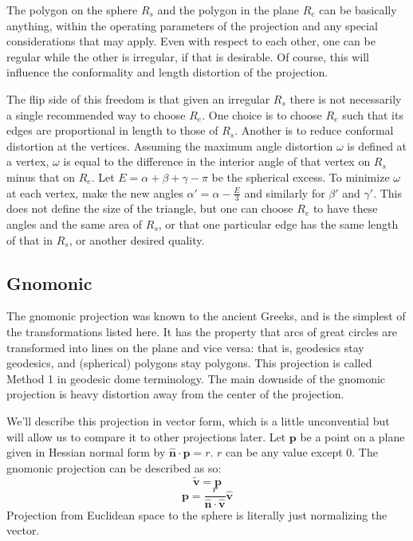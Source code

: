 \documentclass{amsart}[12pt]
\begin{document}
The polygon on the sphere $R_s$ and the polygon in the plane $R_e$ can be
basically anything, within the operating parameters of the projection and any
special considerations that may apply. Even with respect to each other, one
can be regular while the other is irregular, if that is desirable. Of course,
this will influence the conformality and length distortion of the projection.

The flip side of this freedom is that given an irregular $R_s$ there is not
necessarily a single recommended way to choose $R_e$. One choice is to choose
$R_e$ such that its edges are proportional in length to those of $R_s$. Another
is to reduce conformal distortion at the vertices. Assuming the maximum angle
distortion $\omega$ is defined at a vertex, $\omega$ is equal to the difference
in the interior angle of that vertex on $R_s$ minus that on $R_e$. Let
$E = \alpha + \beta + \gamma - \pi$ be the spherical excess. To minimize
$\omega$ at each vertex, make the new angles $\alpha' = \alpha - \frac{E}{3}$
and similarly for $\beta'$ and $\gamma'$. This does not define the size of the
triangle, but one can choose $R_e$ to have these angles and the same area of
$R_s$, or that one particular edge has the same length of that in $R_s$, or
another desired quality.

\subsection{Gnomonic}
The gnomonic projection was known to the ancient Greeks, and is the simplest
of the transformations listed here.\cite{snyder87} It has the property that
arcs of great circles are transformed into lines on the plane and vice versa:
that is, geodesics stay geodesics, and (spherical) polygons stay polygons. This
projection is called Method 1 in geodesic dome terminology.\cite{kenner} The
main downside of the gnomonic projection is heavy distortion away from the
center of the projection.

We'll describe this projection in vector form, which is a little unconvential
but will allow us to compare it to other projections later.
Let $\mathbf p$ be a point on a plane given in Hessian normal form by
$\hat{\mathbf n} \cdot \mathbf p = r$. $r$ can be any value except 0.
The gnomonic projection can be described as so:
\begin{equation}
  \widetilde{\mathbf v} = \mathbf p
\end{equation}
\begin{equation}
\mathbf p = \frac{r}
  {\hat{\mathbf n} \cdot \hat{\mathbf v}}\hat{\mathbf v}
\end{equation}
Projection from Euclidean space to the sphere is literally just
normalizing the vector.
\end{document}
